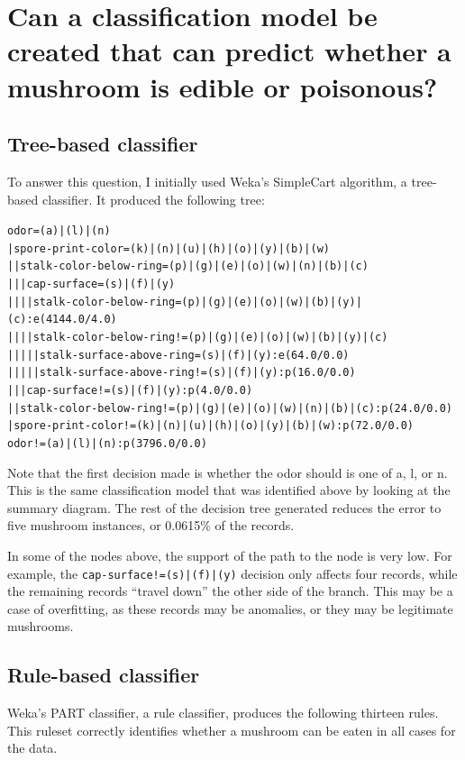 \documentclass[margin,letterpaper,11pt]{scrartcl}
\begin{document}
\section{Can a classification model be created that can predict whether a
mushroom is edible or poisonous?}

\subsection{Tree-based classifier}

To answer this question, I initially used Weka's SimpleCart algorithm, a
tree-based classifier. It produced the following tree:

\begin{alltt}
odor=(a)|(l)|(n)
|  spore-print-color=(k)|(n)|(u)|(h)|(o)|(y)|(b)|(w)
|  |  stalk-color-below-ring=(p)|(g)|(e)|(o)|(w)|(n)|(b)|(c)
|  |  |  cap-surface=(s)|(f)|(y)
|  |  |  |  stalk-color-below-ring=(p)|(g)|(e)|(o)|(w)|(b)|(y)|(c): e(4144.0/4.0)
|  |  |  |  stalk-color-below-ring!=(p)|(g)|(e)|(o)|(w)|(b)|(y)|(c)
|  |  |  |  |  stalk-surface-above-ring=(s)|(f)|(y): e(64.0/0.0)
|  |  |  |  |  stalk-surface-above-ring!=(s)|(f)|(y): p(16.0/0.0)
|  |  |  cap-surface!=(s)|(f)|(y): p(4.0/0.0)
|  |  stalk-color-below-ring!=(p)|(g)|(e)|(o)|(w)|(n)|(b)|(c): p(24.0/0.0)
|  spore-print-color!=(k)|(n)|(u)|(h)|(o)|(y)|(b)|(w): p(72.0/0.0)
odor!=(a)|(l)|(n): p(3796.0/0.0)
\end{alltt}

Note that the first decision made is whether the odor should is one of a, l,
or n. This is the same classification model that was identified above by
looking at the summary diagram. The rest of the decision tree generated
reduces the error to five mushroom instances, or 0.0615\% of the records.

In some of the nodes above, the support of the path to the node is very low.
For example, the \texttt{cap-surface!=(s)|(f)|(y)} decision only affects four
records, while the remaining records ``travel down'' the other side of the
branch. This may be a case of overfitting, as these records may be anomalies,
or they may be legitimate mushrooms.

\subsection{Rule-based classifier}

Weka's PART classifier, a rule classifier, produces the following thirteen
rules. This ruleset correctly identifies whether a mushroom can be eaten in
all cases for the data.
\end{document}
